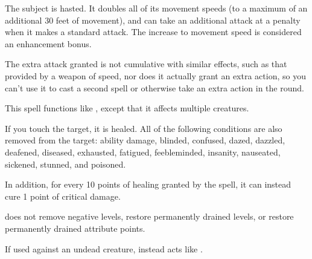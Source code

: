 \spelldur{\durshort}
\begin{spelleffect}
    The subject is hasted. It doubles all of its movement speeds (to a maximum of an additional 30 feet of movement), and can take an additional attack at a  penalty when it makes a standard attack. The increase to movement speed is considered an enhancement bonus.
\end{spelleffect}
\begin{spellnotes}
    The extra attack granted is not cumulative with similar effects, such as that provided by a weapon of speed, nor does it actually grant an extra action, so you can't use it to cast a second spell or otherwise take an extra action in the round.
\end{spellnotes}

\begin{spelleffect}
    This spell functions like , except that it affects multiple creatures.
\end{spelleffect}

\begin{spelleffect}
    If you touch the target, it is healed. All of the following conditions are also removed from the target: ability damage, blinded, confused, dazed, dazzled, deafened, diseased, exhausted, fatigued, feebleminded, insanity, nauseated, sickened, stunned, and poisoned.

    \par In addition, for every 10 points of healing granted by the spell, it can instead cure 1 point of critical damage.
\end{spelleffect}
\begin{spellnotes}
     does not remove negative levels, restore permanently drained levels, or restore permanently drained attribute points.
    \par If used against an undead creature,  instead acts like .
\end{spellnotes}

